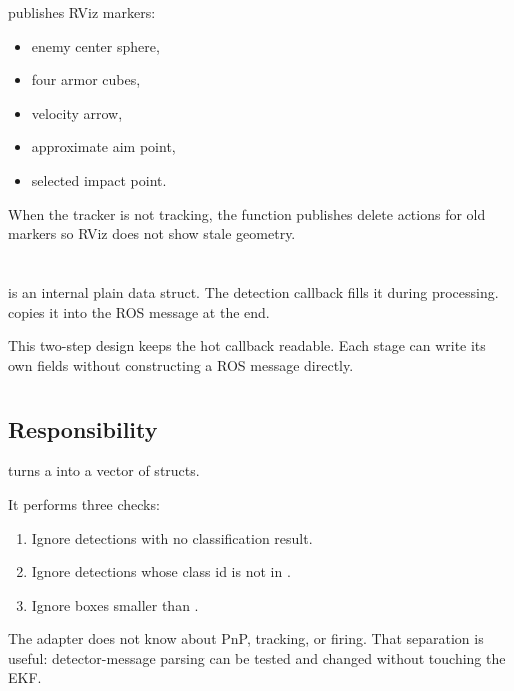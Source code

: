  publishes RViz markers:

\begin{itemize}
  \item enemy center sphere,
  \item four armor cubes,
  \item velocity arrow,
  \item approximate aim point,
  \item selected impact point.
\end{itemize}

When the tracker is not tracking, the function publishes delete actions for
old markers so RViz does not show stale geometry.

\section{}

 is an internal plain data struct. The detection callback
fills it during processing.  copies it into the ROS
message at the end.

This two-step design keeps the hot callback readable. Each stage can write its
own fields without constructing a ROS message directly.

\section{}

\subsection{Responsibility}

 turns a
 into a vector of
 structs.

It performs three checks:

\begin{enumerate}
  \item Ignore detections with no classification result.
  \item Ignore detections whose class id is not in .
  \item Ignore boxes smaller than .
\end{enumerate}

The adapter does not know about PnP, tracking, or firing. That separation is
useful: detector-message parsing can be tested and changed without touching
the EKF.

